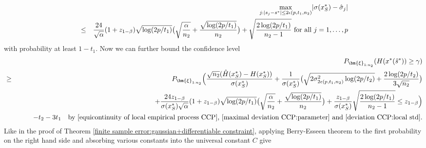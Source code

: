\documentclass[mnsc,blindrev]{informs4} %
\begin{document}
\begin{eqnarray}
\notag&&\max_{j:\lvert s_j-s^*\rvert\leq 2\epsilon(p,t_1,n_2)}\lvert \sigma(x^*_S)-\hat \sigma_j\rvert\\
&\leq&\frac{24}{\sqrt{\alpha}}(1+z_{1-\beta})\sqrt{\log (2p/t_1)}\big(\sqrt{\frac{\alpha}{n_2}}+\frac{\sqrt{\log (2p/t_1)}}{n_2}\big)+\sqrt{\frac{2\log(2p/t_1)}{n_2-1}}\text{ for all }j=1,\ldots,p\label{deviation CCP:local std}
\end{eqnarray}
with probability at least $1-t_1$. Now we can further bound the confidence level
\begin{eqnarray*}
&&P_{\bm{\xi}_{1:n_2}}(H(x^*(\hat s^*))\geq \gamma)\\
&\geq&P_{\bm{\xi}_{1:n_2}}\Big(\frac{\sqrt{n_2}(\hat H(x^*_S)-H(x^*_S))}{\sigma(x^*_S)}+\frac{1}{\sigma(x^*_S)}\big(\sqrt{2\sigma^2_{2\epsilon(p,t_1,n_2)}\log(2p/t_2)}+\frac{2\log(2p/t_2)}{3\sqrt{n_2}}\big)\\
&&\hspace{5ex}+\frac{24z_{1-\beta}}{\sigma(x^*_S)\sqrt{\alpha}}(1+z_{1-\beta})\sqrt{\log (2p/t_1)}\big(\sqrt{\frac{\alpha}{n_2}}+\frac{\sqrt{\log (2p/t_1)}}{n_2}\big)+\frac{z_{1-\beta}}{\sigma(x^*_S)}\sqrt{\frac{2\log(2p/t_1)}{n_2-1}}\leq z_{1-\beta}\Big)\\
&&\hspace{5ex}-t_2-3t_1\text{\ \ \ by \eqref{equicontinuity of local empirical process CCP}, \eqref{maximal deviation CCP:parameter} and \eqref{deviation CCP:local std}}.
\end{eqnarray*}
Like in the proof of Theorem \ref{finite sample error:gaussian+differentiable constraint}, applying Berry-Esseen theorem to the first probability on the right hand side and absorbing various constants into the universal constant $C$ give
\end{document}
